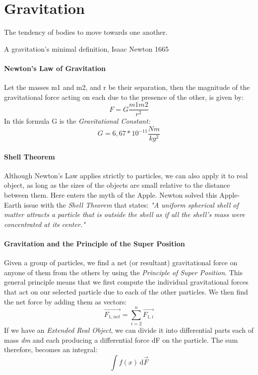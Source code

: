 \documentclass{scrartcl}
\begin{document}
    \section{Gravitation}
    	\epigraph{The tendency of bodies to move towards one another.}{A gravitation's minimal definition, Isaac Newton 1665}
    	\paragraph{Newton's Law of Gravitation} Let the masses m1 and m2, and r be their separation, then the magnitude of the gravitational force acting on each due to the presence of the other, is given by: 
	\begin{equation}
	{F} = {G}   \frac{m1 m2}{r^2} 
	\end{equation}
	In this formula G is the {\em Gravitational Constant:} \begin{equation}{G} = {6, 67 * 10^{-11} \frac{Nm}{kg^2}}\end{equation}
    	
	\paragraph{Shell Theorem} Although Newton's Law applies strictly to particles, we can also apply it to real object, as long as the sizes of the objects are small relative to the distance between them. Here enters the myth of the Apple. 						  Newton solved this Apple-Earth issue with the {\em Shell Theorem} that states: \newline
	{\em "A uniform spherical shell of matter attracts a particle that is outside the shell as if all the shell's mass were concentrated at its center."}				
    	
	\paragraph{Gravitation and the Principle of the Super Position} Given a group of particles, we find a net (or resultant) gravitational force on anyone of them from the others by using the {\em Principle of Super Position}. This general 			 principle  means that we first compute the individual gravitational forces that act on our selected particle due to each of the other particles. We then find the net force by adding them as vectors: 
			\begin{equation}
    				\vec{F_{1,net}} = \sum_{i=2}^{n} \vec{F_{1,i}}
    			\end{equation}
			If we have an {\em Extended Real Object}, we can divide it into differential parts each of mass {\em dm}  and each producing a differential force  dF on the particle. The sum therefore, becomes an integral:
			\begin{equation}
    				\int \! f(x) \, \mathrm{d}\vec{F}			
				\end{equation}
			
\end{document}
